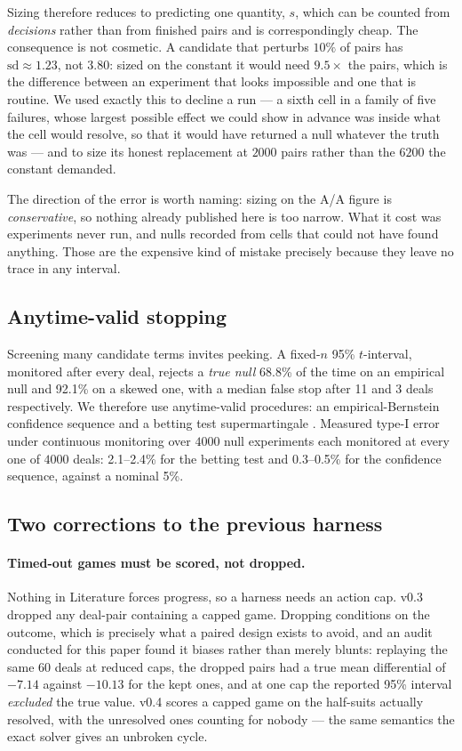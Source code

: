 \documentclass[11pt,a4paper]{article}
\begin{document}
Sizing therefore reduces to predicting one quantity, $s$, which can be counted
from \emph{decisions} rather than from finished pairs and is correspondingly
cheap. The consequence is not cosmetic. A candidate that perturbs $10\%$ of pairs
has $\mathrm{sd} \approx 1.23$, not $3.80$: sized on the constant it would need
$9.5\times$ the pairs, which is the difference between an experiment that looks
impossible and one that is routine. We used exactly this to decline a run --- a
sixth cell in a family of five failures, whose largest possible effect we could
show in advance was inside what the cell would resolve, so that it would have
returned a null whatever the truth was --- and to size its honest replacement at
$2000$ pairs rather than the $6200$ the constant demanded.

The direction of the error is worth naming: sizing on the A/A figure is
\emph{conservative}, so nothing already published here is too narrow. What it
cost was experiments never run, and nulls recorded from cells that could not
have found anything. Those are the expensive kind of mistake precisely because
they leave no trace in any interval.

\subsection{Anytime-valid stopping}

Screening many candidate terms invites peeking. A fixed-$n$ 95\% $t$-interval,
monitored after every deal, rejects a \emph{true null} 68.8\% of the time on an
empirical null and 92.1\% on a skewed one, with a median false stop after 11 and
3 deals respectively. We therefore use anytime-valid procedures: an
empirical-Bernstein confidence sequence and a betting test supermartingale
\citep{waudbysmith2024estimating}. Measured type-I error under continuous
monitoring over $4000$ null experiments each monitored at every one of $4000$
deals: 2.1--2.4\% for the betting test and 0.3--0.5\% for the confidence
sequence, against a nominal 5\%.

\subsection{Two corrections to the previous harness}

\paragraph{Timed-out games must be scored, not dropped.} Nothing in Literature
forces progress, so a harness needs an action cap. v0.3 dropped any deal-pair
containing a capped game. Dropping conditions on the outcome, which is precisely
what a paired design exists to avoid, and an audit conducted for this paper
found it biases rather than merely blunts: replaying the same 60 deals at
reduced caps, the dropped pairs had a true mean differential of $-7.14$ against
$-10.13$ for the kept ones, and at one cap the reported 95\% interval
\emph{excluded} the true value. v0.4 scores a capped game on the half-suits
actually resolved, with the unresolved ones counting for nobody --- the same
semantics the exact solver gives an unbroken cycle.
\end{document}
